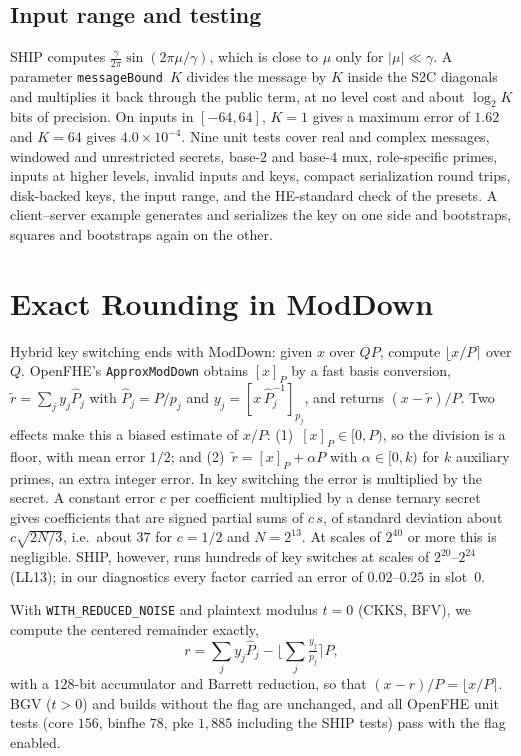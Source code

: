 \documentclass[sigconf,nonacm]{acmart}
\begin{document}
\subsection{Input range and testing}
SHIP computes $\frac{\gamma}{2\pi}\sin(2\pi\mu/\gamma)$, which is close to $\mu$ only for $|\mu|\ll\gamma$.
A parameter \texttt{messageBound}~$K$ divides the message by $K$ inside the S2C diagonals and multiplies it back through the public term, at no level cost and about $\log_2 K$ bits of precision.
On inputs in $[-64,64]$, $K=1$ gives a maximum error of $1.62$ and $K=64$ gives $4.0\times10^{-4}$.
Nine unit tests cover real and complex messages, windowed and unrestricted secrets, base-$2$ and base-$4$ mux, role-specific primes, inputs at higher levels, invalid inputs and keys, compact serialization round trips, disk-backed keys, the input range, and the HE-standard check of the presets.
A client--server example generates and serializes the key on one side and bootstraps, squares and bootstraps again on the other.

\section{Exact Rounding in ModDown}
\label{sec:moddown}

Hybrid key switching ends with $\mathrm{ModDown}$: given $x$ over $QP$, compute $\lfloor x/P\rceil$ over $Q$.
OpenFHE's \texttt{ApproxModDown} obtains $[x]_P$ by a fast basis conversion, $\tilde r=\sum_j y_j\hat P_j$ with $\hat P_j=P/p_j$ and $y_j=[x\,\hat P_j^{-1}]_{p_j}$, and returns $(x-\tilde r)/P$.
Two effects make this a biased estimate of $x/P$:
(1)~$[x]_P\in[0,P)$, so the division is a floor, with mean error $1/2$; and
(2)~$\tilde r = [x]_P + \alpha P$ with $\alpha\in[0,k)$ for $k$ auxiliary primes, an extra integer error.
In key switching the error is multiplied by the secret.
A constant error $c$ per coefficient multiplied by a dense ternary secret gives coefficients that are signed partial sums of $c\,s$, of standard deviation about $c\sqrt{2N/3}$, i.e.\ about $37$ for $c=1/2$ and $N=2^{13}$.
At scales of $2^{40}$ or more this is negligible.
SHIP, however, runs hundreds of key switches at scales of $2^{20}$--$2^{24}$ (LL13); in our diagnostics every factor carried an error of $0.02$--$0.25$ in slot~$0$.

With \texttt{WITH\_REDUCED\_NOISE} and plaintext modulus $t=0$ (CKKS, BFV), we compute the centered remainder exactly,
\[
r=\sum_j y_j \hat P_j - \Big\lfloor \sum_j \tfrac{y_j}{p_j} \Big\rceil P,
\]
with a $128$-bit accumulator and Barrett reduction, so that $(x-r)/P=\lfloor x/P\rceil$.
BGV ($t>0$) and builds without the flag are unchanged, and all OpenFHE unit tests (core $156$, binfhe $78$, pke $1{,}885$ including the SHIP tests) pass with the flag enabled.
\end{document}
